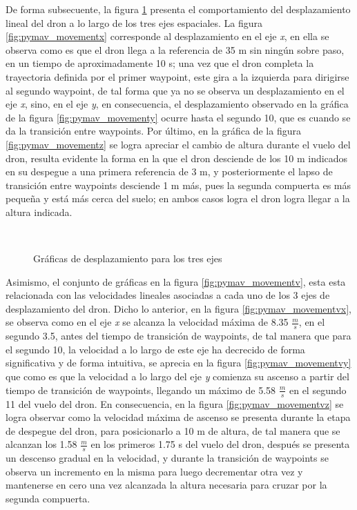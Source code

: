 De forma subsecuente, la figura \ref{fig:pymav_movementd} presenta el comportamiento del desplazamiento lineal del dron a lo largo de los tres ejes espaciales. La figura \ref{fig:pymav_movementx} corresponde al desplazamiento en el eje \textit{x}, en ella se observa como es que el dron llega a la referencia de 35 m sin ningún sobre paso, en un tiempo de aproximadamente 10 s; una vez que el dron completa la trayectoria definida por el primer waypoint, este gira a la izquierda para dirigirse al segundo waypoint, de tal forma que ya no se observa un desplazamiento en el eje \textit{x}, sino, en el eje \textit{y}, en consecuencia, el desplazamiento observado en la gráfica de la figura \ref{fig:pymav_movementy} ocurre hasta el segundo 10, que es cuando se da la transición entre waypoints. Por último, en la gráfica de la figura \ref{fig:pymav_movementz} se logra apreciar el cambio de altura durante el vuelo del dron, resulta evidente la forma en la que el dron desciende de los 10 m indicados en su despegue a una primera referencia de 3 m, y posteriormente el lapso de transición entre waypoints desciende 1 m más, pues la segunda compuerta es más pequeña y está más cerca del suelo; en ambos casos logra el dron logra llegar a la altura indicada.

\begin{figure}[ht]
    \centering
    \hfill
    \\
    \hfill

    \caption{Gráficas de desplazamiento para los tres ejes}
    \label{fig:pymav_movementd}
\end{figure}

Asimismo, el conjunto de gráficas en la figura \ref{fig:pymav_movementv}, esta esta relacionada con las velocidades lineales asociadas a cada uno de los 3 ejes de desplazamiento del dron. Dicho lo anterior, en la figura \ref{fig:pymav_movementvx}, se observa como en el eje \textit{x} se alcanza la velocidad máxima de 8.35 $\frac{m}{s}$, en el segundo 3.5, antes del tiempo de transición de waypoints, de tal manera que para el segundo 10, la velocidad a lo largo de este eje ha decrecido de forma significativa y de forma intuitiva, se aprecia en la figura \ref{fig:pymav_movementvy} que como es que la velocidad a lo largo del eje \textit{y} comienza su ascenso a partir del tiempo de transición de waypoints, llegando un máximo de 5.58 $\frac{m}{s}$ en el segundo 11 del vuelo del dron. En consecuencia, en la figura \ref{fig:pymav_movementvz} se logra observar como la velocidad máxima de ascenso se presenta durante la etapa de despegue del dron, para posicionarlo a 10 m de altura, de tal manera que se alcanzan los 1.58 $\frac{m}{s}$ en los primeros 1.75 s del vuelo del dron, después se presenta un descenso gradual en la velocidad, y durante la transición de waypoints se observa un incremento en la misma para luego decrementar otra vez y mantenerse en cero una vez alcanzada la altura necesaria para cruzar por la segunda compuerta.

